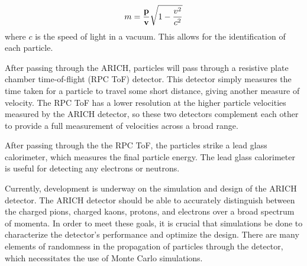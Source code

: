 \begin{equation}
    \label{eq:relMass}
    m = \frac{\bf{p}}{\bf{v}}\sqrt{1-\frac{v^2}{c^2}}
\end{equation}
where $c$ is the speed of light in a vacuum. This allows for the identification of each particle.

After passing through the ARICH, particles will pass through a resistive plate chamber time-of-flight (RPC ToF) detector. This detector simply measures the time taken for a particle to travel some short distance, giving another measure of velocity. The RPC ToF has a lower resolution at the higher particle velocities measured by the ARICH detector, so these two detectors complement each other to provide a full measurement of velocities across a broad range.

After passing through the the RPC ToF, the particles strike a lead glass calorimeter, which measures the final particle energy. The lead glass calorimeter is useful for detecting any electrons or neutrons.

Currently, development is underway on the simulation and design of the ARICH detector. The ARICH detector should be able to accurately distinguish between the charged pions, charged kaons, protons, and electrons over a broad spectrum of momenta. In order to meet these goals, it is crucial that simulations be done to characterize the detector's performance and optimize the design. There are many elements of randomness in the propagation of particles through the detector, which necessitates the use of Monte Carlo simulations. 




\endinput

Any text after an \endinput is ignored.
You could put scraps here or things in progress.
